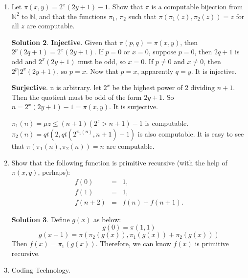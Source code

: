 \documentclass[12pt,a4paper]{article}
\theoremstyle{definition}
\newtheorem*{solution}{Solution}
\numberwithin{equation}{section}
\numberwithin{figure}{section}
\begin{document}
\begin{enumerate}
\begin{enumerate}
                       where $p(x)$ is a polynomial with integer coefficients.
    \item $f(x,y)=\left\{\begin{array}{ll}
        x/y & \mbox{if } y\neq 0 \mbox{ and } y|x,\\
        \mbox{undefined} & \mbox{otherwise}.
        \end{array}\right.$
    \end{enumerate}

\begin{solution}
\begin{enumerate}
    \item  $f^{-1}(y) = \mu z(f(z) = y)$
    
    \item $ f(y) = \mu z (z^2 = p(x)-y, (z\in \mathbb{N}) ) $
    
    \item $f(x,y) = \mu z (|mult(z,y) - x| = 0)$
\end{enumerate}

\end{solution}

\item Let $\pi (x,y)=2^{x}(2y+1)-1$. Show that $\pi$ is a computable bijection from $\mathbb{N}^{2}$ to $\mathbb{N}$, and that the functions $\pi_{1}$, $\pi_{2}$ such that $\pi(\pi_{1}(z),\pi_{2}(z))=z$ for all $z$ are computable.
    \begin{solution}
    \textbf{Injective}. Given that $\pi (p,q) = \pi (x,y)$, then $2^{p}(2q+1) = 2^{x}(2y+1)$. If $p =0$ or $x = 0$, suppose $p=0$, then $2q+1$ is odd and $2^{x}(2y+1)$ must be odd, so $x=0$. If $p \neq 0$ and $x \neq 0$, then $2^p|2^x(2y+1)$, so $p = x$. Now that $p = x$, apparently $q = y$. It is injective.
    
    \textbf{Surjective}. n is arbitrary. let $2^x$ be the highest power of 2 dividing $n+1$. Then the quotient must be odd of the form $2y+1$. So $n = 2^x(2y+1) -1 = \pi(x,y)$. It is surjective.
    
    $\pi_1(n) = \mu z \leq (n+1) (2^z > n+1) - 1$ is computable. $\pi_2(n) = qt(2,qt(2^{\pi_1(n)} , n+1)-1)$ is also computable. It is easy to see that $\pi(\pi_{1}(n),\pi_{2}(n))=n$ are computable. 
    
    \end{solution}

\item Show that the following function is primitive recursive (with the help of $\pi(x,y)$, perhaps):
\begin{eqnarray*}
  f(0) & = & 1, \\
  f(1) & = & 1, \\
  f(n+2) & = & f(n) + f(n+1).
\end{eqnarray*}
    \begin{solution}
    Define $g(x)$ as below:
    $$
    g(0) = \pi (1,1)
    $$
    $$
    g(x+1) = \pi( \pi_2 (g(x)), \pi_1(g(x)) + \pi_2(g(x)))
    $$
    Then $f(x) = \pi_1(g(x))$. Therefore, we can know $f(x)$ is primitive recursive.
    \end{solution}
  \item Coding Technology.


\end{enumerate}
\end{document}
